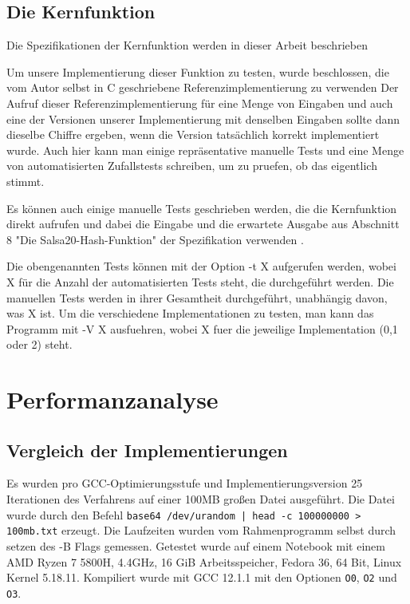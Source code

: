 \documentclass[course=erap]{aspdoc}
\begin{document}
\subsection{Die Kernfunktion}
Die Spezifikationen der Kernfunktion werden in dieser Arbeit beschrieben \cite{salsa20specification}

Um unsere Implementierung dieser Funktion zu testen, wurde beschlossen, die vom Autor selbst in C geschriebene Referenzimplementierung zu verwenden \cite{salsa20}
Der Aufruf dieser Referenzimplementierung für eine Menge von Eingaben und auch eine der Versionen unserer Implementierung mit denselben Eingaben sollte dann dieselbe Chiffre ergeben, wenn die Version tatsächlich korrekt implementiert wurde. 
Auch hier kann man einige repräsentative manuelle Tests und eine Menge von automatisierten Zufallstests schreiben, um zu pruefen, ob das eigentlich stimmt. 

Es können auch einige manuelle Tests geschrieben werden, die die Kernfunktion direkt aufrufen und dabei die Eingabe und die erwartete Ausgabe aus Abschnitt 8 "Die Salsa20-Hash-Funktion" der Spezifikation verwenden \cite{salsa20specification}.



Die obengenannten Tests können mit der Option -t X aufgerufen werden, wobei X für die Anzahl der automatisierten Tests steht, die durchgeführt werden. Die manuellen Tests werden in ihrer Gesamtheit durchgeführt, unabhängig davon, was X ist. Um die verschiedene Implementationen zu testen, man kann das Programm mit -V X ausfuehren, wobei X fuer die jeweilige Implementation (0,1 oder 2) steht.


\section{Performanzanalyse}
\subsection{Vergleich der Implementierungen}
Es wurden pro GCC-Optimierungsstufe und Implementierungsversion 25 
Iterationen des Verfahrens auf einer 100MB großen Datei ausgeführt. Die Datei
wurde durch den Befehl \texttt{base64 /dev/urandom | head -c 100000000 > 100mb.txt}
erzeugt.
Die Laufzeiten wurden vom Rahmenprogramm selbst durch setzen des -B Flags
gemessen. Getestet wurde auf einem Notebook mit einem AMD Ryzen 7 5800H, 
4.4GHz, 16 GiB Arbeitsspeicher, Fedora 36, 64 Bit, Linux Kernel 5.18.11.
Kompiliert wurde mit GCC 12.1.1 mit den Optionen \texttt{O0}, \texttt{O2} und \texttt{O3}.
\end{document}
